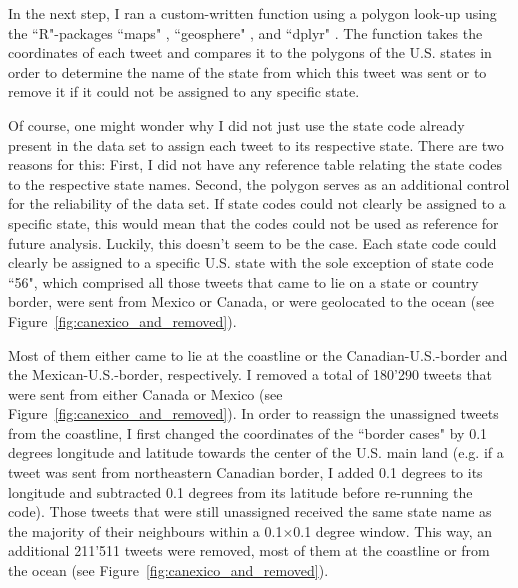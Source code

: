 \documentclass[11pt, a4paper,twoside]{report}\usepackage[]{graphicx}\usepackage[]{color}
\begin{document}
In the next step, I ran a custom-written function using a polygon look-up using the ``R"-packages ``maps" \citep{maps_2016}, ``geosphere" \citep{geosphere_2016}, and ``dplyr" \citep{dplyr_2016}. The function takes the coordinates of each tweet and compares it to the polygons of the U.S. states in order to determine the name of the state from which this tweet was sent or to remove it if it could not be assigned to any specific state. 

Of course, one might wonder why I did not just use the state code already present in the data set to assign each tweet to its respective state. There are two reasons for this: First, I did not have any reference table relating the state codes to the respective state names. Second, the polygon serves as an additional control for the reliability of the data set. If state codes could not clearly be assigned to a specific state, this would mean that the codes could not be used as reference for future analysis. Luckily, this doesn't seem to be the case. Each state code could clearly be assigned to a specific U.S. state with the sole exception of state code ``56", which comprised all those tweets that came to lie on a state or country border, were sent from Mexico or Canada, or were geolocated to the ocean (see Figure~\ref{fig:canexico_and_removed}).

Most of them either came to lie at the coastline or the Canadian-U.S.-border and the Mexican-U.S.-border, respectively. I removed a total of 180'290 tweets that were sent from either Canada or Mexico (see Figure~\ref{fig:canexico_and_removed}). In order to reassign the unassigned tweets from the coastline, I first changed the coordinates of the ``border cases" by 0.1 degrees longitude and latitude towards the center of the U.S. main land (e.g. if a tweet was sent from northeastern Canadian border, I added 0.1 degrees to its longitude and subtracted 0.1 degrees from its latitude before re-running the code). Those tweets that were still unassigned received the same state name as the majority of their neighbours within a 0.1$\times$0.1 degree window. This way, an additional 211'511 tweets were removed, most of them at the coastline or from the ocean (see Figure~\ref{fig:canexico_and_removed}).
\end{document}
